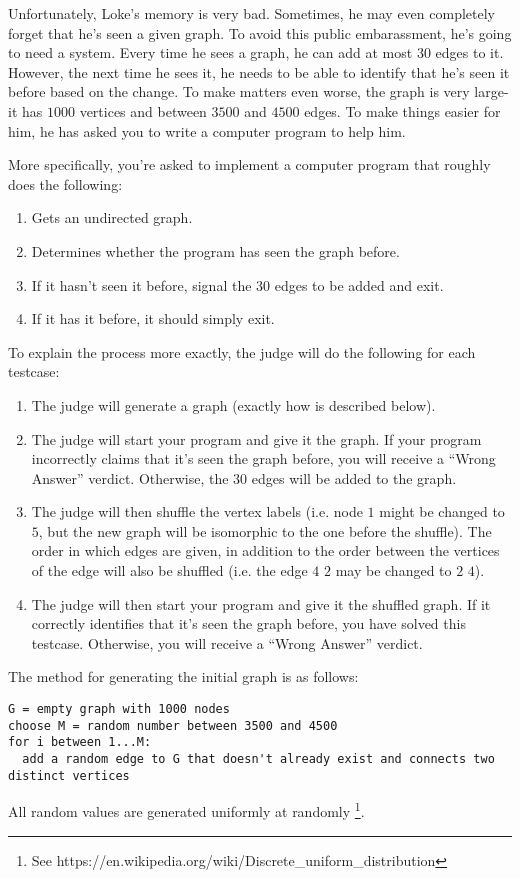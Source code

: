 \noindent
Unfortunately, Loke's memory is very bad. Sometimes, he may even completely forget that he's seen a given graph. 
To avoid this public embarassment, he's going to need a system. Every time he sees a graph, he can add at most $30$
edges to it. However, the next time he sees it, he needs to be able to identify that he's seen it before based on the
change. To make matters even worse, the graph is very large- it has $1000$ vertices and between $3500$ and $4500$ edges.
To make things easier for him, he has asked you to write a computer program to help him.

More specifically, you're asked to implement a computer program that roughly does the following:
\begin{enumerate}
  \item Gets an undirected graph.
  \item Determines whether the program has seen the graph before.
  \item If it hasn't seen it before, signal the $30$ edges to be added and exit.
  \item If it has it before, it should simply exit.
\end{enumerate}
To explain the process more exactly, the judge will do the following for each testcase:
\begin{enumerate}
  \item The judge will generate a graph (exactly how is described below).
  \item The judge will start your program and give it the graph. If your program incorrectly claims that it's seen the graph before,
  you will receive a ``Wrong Answer'' verdict. Otherwise, the $30$ edges will be added to the graph.
  \item The judge will then shuffle the vertex labels (i.e. node $1$ might be changed to $5$, but the new
  graph will be isomorphic to the one before the shuffle). The order in which edges are given, in addition to the
  order between the vertices of the edge will also be shuffled (i.e. the edge $4$ $2$ may be changed to $2$ $4$).
  \item The judge will then start your program and give it the shuffled graph. If it correctly identifies that
  it's seen the graph before, you have solved this testcase. Otherwise, you will receive a ``Wrong Answer'' verdict.
\end{enumerate}


The method for generating the initial graph is as follows:
\begin{verbatim}
G = empty graph with 1000 nodes
choose M = random number between 3500 and 4500
for i between 1...M:
  add a random edge to G that doesn't already exist and connects two distinct vertices
\end{verbatim}
All random values are generated uniformly at randomly \footnote{See https://en.wikipedia.org/wiki/Discrete\_uniform\_distribution}.

